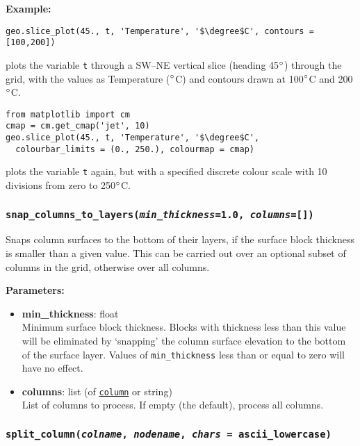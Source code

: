 \textbf{Example:}

\begin{lstlisting}
geo.slice_plot(45., t, 'Temperature', '$\degree$C', contours = [100,200])
\end{lstlisting}

plots the variable \texttt{t} through a SW--NE vertical slice (heading 45$\degree$) through the grid, with the values as Temperature ($\degree$C) and contours drawn at 100$\degree$C and 200$\degree$C.

\begin{lstlisting}
from matplotlib import cm
cmap = cm.get_cmap('jet', 10)
geo.slice_plot(45., t, 'Temperature', '$\degree$C',
  colourbar_limits = (0., 250.), colourmap = cmap)
\end{lstlisting}

plots the variable \texttt{t} again, but with a specified discrete colour scale with 10 divisions from zero to 250$\degree$C.

\begin{snugshade}\subsubsection{\texttt{snap\_columns\_to\_layers(\emph{min\_thickness}=1.0, \emph{columns}=[])}}\end{snugshade}
\label{sec:mulgrid:snap_columns_to_layers}

Snaps column surfaces to the bottom of their layers, if the surface block thickness is smaller than a given value.  This can be carried out over an optional subset of columns in the grid, otherwise over all columns.

\textbf{Parameters:}
\begin{itemize}
\item \textbf{min\_thickness}: float\\
  Minimum surface block thickness.  Blocks with thickness less than this value will be eliminated by `snapping' the column surface elevation to the bottom of the surface layer.  Values of \texttt{min\_thickness} less than or equal to zero will have no effect.
\item \textbf{columns}: list (of \hyperref[columnobjects]{\texttt{column}} or string)\\
  List of columns to process.  If empty (the default), process all columns.
\end{itemize}

\begin{snugshade}\subsubsection{\texttt{split\_column(\emph{colname}, \emph{nodename}, \emph{chars} = ascii\_lowercase)}}\end{snugshade}
\label{sec:mulgrid:split_column}

